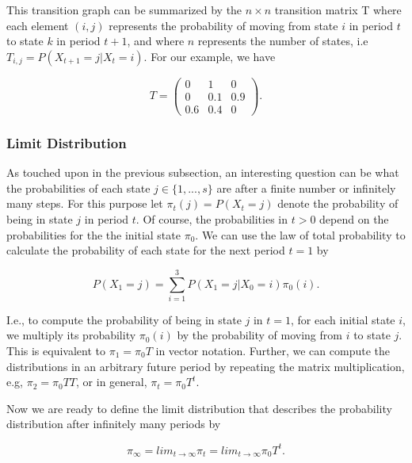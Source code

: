 \documentclass[12pt,english,a4paper,oneside]{article}
\theoremstyle{definition}
\theoremstyle{definition}
\theoremstyle{definition}
\theoremstyle{definition}
\theoremstyle{remark}
\begin{document}
\noindent
This transition graph can be summarized by the \(n \times n\) transition matrix T where each element \((i,j)\) represents the probability of moving from state \(i\) in period \(t\) to state \(k\) in period \(t+1\), and where \(n\) represents the number of states, i.e \(T_{i,j} = P(X_{t+1}=j | X_t = i)\). For our example, we have

\begin{equation}
\label{eq:transition-matrix}
T=
\begin{pmatrix}
0 & 1 & 0\\
0 & 0.1 & 0.9\\
0.6 & 0.4 & 0
\end{pmatrix}
.
\end{equation}

\hypertarget{limit-distribution}{%
\subsubsection{Limit Distribution}\label{limit-distribution}}

As touched upon in the previous subsection, an interesting question can be what the probabilities of each state \(j \in \{1, ..., s\}\) are after a finite number or infinitely many steps. For this purpose let \(\pi_t (j) = P(X_t = j)\) denote the probability of being in state \(j\) in period \(t\). Of course, the probabilities in \(t>0\) depend on the probabilities for the the initial state \(\pi_0\). We can use the law of total probability to calculate the probability of each state for the next period \(t=1\) by

\begin{equation}
\label{eq:tot-prob}
P(X_1 = j) = \sum_{i=1}^{3} P(X_1 = j | X_0 = i) \pi_0(i).
\end{equation}

\noindent
I.e., to compute the probability of being in state \(j\) in \(t=1\), for each initial state \(i\), we multiply its probability \(\pi_0(i)\) by the probability of moving from \(i\) to state \(j\). This is equivalent to \(\pi_1 = \pi_0 T\) in vector notation. Further, we can compute the distributions in an arbitrary future period by repeating the matrix multiplication, e.g, \(\pi_2 = \pi_0 T T\), or in general, \(\pi_t = \pi_0 T^t\).

Now we are ready to define the limit distribution that describes the probability distribution after infinitely many periods by

\begin{equation}
\label{eq:lim-dist}
\pi_{\infty} = lim_{t \rightarrow \infty} \pi_t = lim_{t \rightarrow \infty} \pi_0 T^t.
\end{equation}
\end{document}

